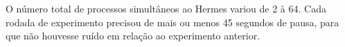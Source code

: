

O número total de processos simultâneos ao Hermes variou de 2 à 64. Cada rodada de experimento precisou de mais ou menos 45 segundos de pausa, para que não houvesse ruído em relação ao experimento anterior.

